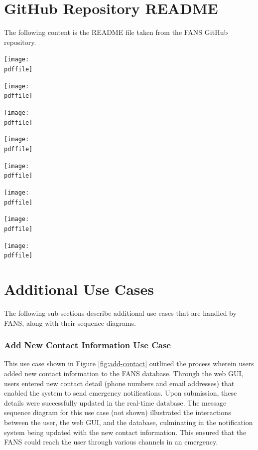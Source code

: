 \appendix

\pagebreak
\section{GitHub Repository README}

The following content is the README file taken from the FANS GitHub repository.

\def\pdffile{../../README.pdf}

\begin{center}
    \texttt{[image: \\pdffile]}

    \texttt{[image: \\pdffile]}

    \texttt{[image: \\pdffile]}

    \texttt{[image: \\pdffile]}

    \texttt{[image: \\pdffile]}

    \texttt{[image: \\pdffile]}

    \texttt{[image: \\pdffile]}

    \texttt{[image: \\pdffile]}
\end{center}

\section{Additional Use Cases} \label{ap:sequence}

The following sub-sections describe additional use cases that are handled by FANS, along with their sequence diagrams.

\subsubsection{Add New Contact Information Use Case}

This use case shown in Figure \ref{fig:add-contact} outlined the process wherein users added new contact information to
the FANS database. Through the web GUI, users entered new contact detail (phone numbers and email addresses) that
enabled the system to send emergency notifications. Upon submission, these details were successfully updated in the
real-time database. The message sequence diagram for this use case (not shown) illustrated the interactions between the
user, the web GUI, and the database, culminating in the notification system being updated with the new contact
information. This ensured that the FANS could reach the user through various channels in an emergency.

